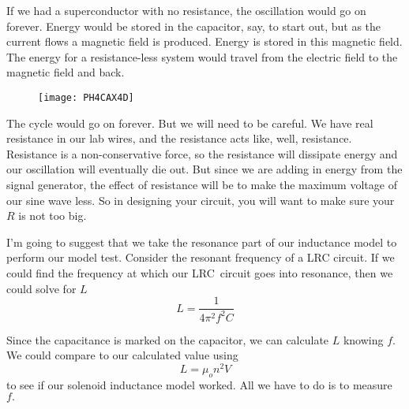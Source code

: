 If we had a superconductor with no resistance, the oscillation would go on forever. Energy would be stored in the capacitor, say, to start out, but as the current flows a magnetic field is produced. Energy is stored in this magnetic field. The energy for a resistance-less system would travel from the electric field to the magnetic field and back.
\begin{figure}[h!]
	\centering
	\texttt{[image: PH4CAX4D]}
\end{figure}
The cycle would go on forever. But we will need to be careful. We have real resistance in our lab wires, and the resistance acts like, well, resistance. Resistance is a non-conservative force, so the resistance will dissipate energy and our oscillation will eventually die out. But since we are adding in energy from the signal generator, the effect of resistance will be to make the maximum voltage of our sine wave less. So in designing your circuit, you will want to make sure your $R$ is not too big.

I'm going to suggest that we take the resonance part of our inductance model to perform our model test. Consider the resonant frequency of a LRC circuit. If we could find the frequency at which our LRC\ circuit goes into resonance, then we could solve for $L$%
\begin{equation*}
	L=\frac{1}{4\pi ^{2}f^{2}C}
\end{equation*}

Since the capacitance is marked on the capacitor, we can calculate $L$ knowing $f.$ We could compare to our calculated value using 
\begin{equation*}
	L=\mu _{o}n^{2}V
\end{equation*}
to see if our solenoid inductance model worked. All we have to do is to measure $f.$

